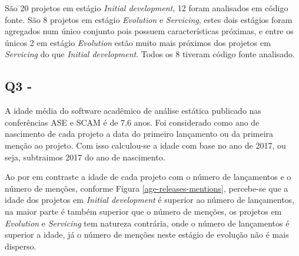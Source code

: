 
São 20 projetos em estágio {\it Initial development}, 12 foram analisados em
código fonte. São 8 projetos em estágio {\it Evolution} e {\it Servicing},
estes dois estágios foram agregados num único conjunto pois possuem
características próximas, e entre os únicos 2 em estágio {\it Evolution} estão
muito mais próximos dos projetos em {\it Servicing} do que {\it Initial
development}. Todos os 8 tiveram código fonte analisado.


\subsection{Q3 - \QuestaoTres} %

A idade média do software acadêmico de análise estática publicado nas
conferências ASE e SCAM é de 7,6 anos. Foi considerado como ano de nascimento
de cada projeto a data do primeiro lançamento ou da primeira menção ao projeto.
Com isso calculou-se a idade com base no ano de 2017, ou seja, subtraimos 2017
do ano de nascimento.

Ao por em contraste a idade de cada projeto com o número de lançamentos e o
número de menções, conforme Figura \ref{age-releases-mentions}, percebe-se que
a idade dos projetos em {\it Initial development} é superior ao número de
lançamentos, na maior parte é também superior que o número de menções, os
projetos em {\it Evolution} e {\it Servicing} tem natureza contrária, onde o
número de lançamentos é superior a idade, já o número de menções neste estágio
de evolução não é mais disperso.

